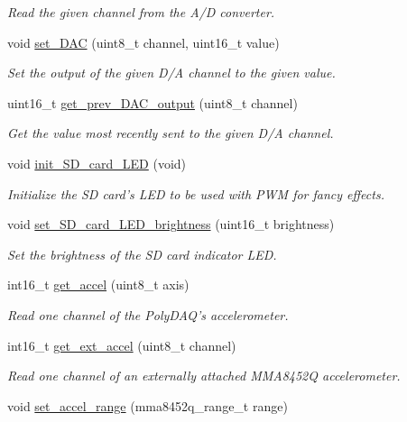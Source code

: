 \begin{DoxyCompactItemize}
\begin{DoxyCompactList}\small\item\em Read the given channel from the A/\-D converter. \end{DoxyCompactList}\item 
void \hyperlink{classpolydaq2_a89a98fa2fbc6959b4c9cfd828623d803}{set\-\_\-\-D\-A\-C} (uint8\-\_\-t channel, uint16\-\_\-t value)
\begin{DoxyCompactList}\small\item\em Set the output of the given D/\-A channel to the given value. \end{DoxyCompactList}\item 
uint16\-\_\-t \hyperlink{classpolydaq2_aee8448f01c2acd373be480492e99a214}{get\-\_\-prev\-\_\-\-D\-A\-C\-\_\-output} (uint8\-\_\-t channel)
\begin{DoxyCompactList}\small\item\em Get the value most recently sent to the given D/\-A channel. \end{DoxyCompactList}\item 
void \hyperlink{classpolydaq2_a6431374db64f3bee17c417ce1904cd65}{init\-\_\-\-S\-D\-\_\-card\-\_\-\-L\-E\-D} (void)
\begin{DoxyCompactList}\small\item\em Initialize the S\-D card's L\-E\-D to be used with P\-W\-M for fancy effects. \end{DoxyCompactList}\item 
void \hyperlink{classpolydaq2_a562843837eb728576876cfb4224b6b39}{set\-\_\-\-S\-D\-\_\-card\-\_\-\-L\-E\-D\-\_\-brightness} (uint16\-\_\-t brightness)
\begin{DoxyCompactList}\small\item\em Set the brightness of the S\-D card indicator L\-E\-D. \end{DoxyCompactList}\item 
int16\-\_\-t \hyperlink{classpolydaq2_aedf6a4bb904fe3e0dc8ad9b89c3cdc33}{get\-\_\-accel} (uint8\-\_\-t axis)
\begin{DoxyCompactList}\small\item\em Read one channel of the Poly\-D\-A\-Q's accelerometer. \end{DoxyCompactList}\item 
int16\-\_\-t \hyperlink{classpolydaq2_a4a7381f5d992f03cfaff21c5b88bb30c}{get\-\_\-ext\-\_\-accel} (uint8\-\_\-t channel)
\begin{DoxyCompactList}\small\item\em Read one channel of an externally attached M\-M\-A8452\-Q accelerometer. \end{DoxyCompactList}\item 
\hypertarget{classpolydaq2_ada5828197e8746b385b6461d0a924d42}{void \hyperlink{classpolydaq2_ada5828197e8746b385b6461d0a924d42}{set\-\_\-accel\-\_\-range} (mma8452q\-\_\-range\-\_\-t range)}\label{classpolydaq2_ada5828197e8746b385b6461d0a924d42}


\end{DoxyCompactItemize}
